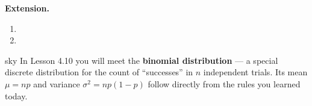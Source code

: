 \documentclass[10pt]{article}
\begin{document}
\vspace{0.1in}

\begin{extensionbox}
\small
\textbf{Extension.}
\begin{enumerate}[leftmargin=1.5em, itemsep=6pt]
  \item {}

  \item {}
\end{enumerate}
\end{extensionbox}

\vspace{0.1in}

\begin{blurbbox}{sky}
\small
In Lesson 4.10 you will meet the \textbf{binomial distribution} --- a special discrete
distribution for the count of ``successes'' in $n$ independent trials. Its mean $\mu = np$
and variance $\sigma^2 = np(1-p)$ follow directly from the rules you learned today.
\end{blurbbox}
\end{document}
